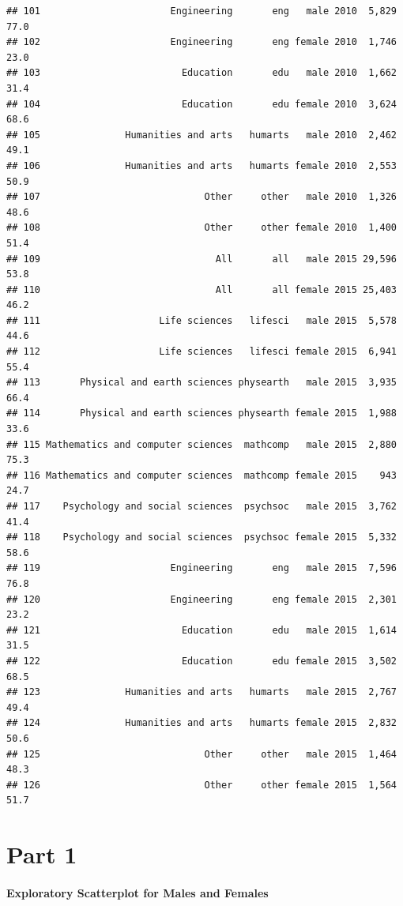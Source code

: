 \documentclass[]{article}
\let\oldparagraph\paragraph
\renewcommand{\paragraph}[1]{\oldparagraph{#1}\mbox{}}
\begin{document}
\begin{verbatim}
## 101                       Engineering       eng   male 2010  5,829    77.0
## 102                       Engineering       eng female 2010  1,746    23.0
## 103                         Education       edu   male 2010  1,662    31.4
## 104                         Education       edu female 2010  3,624    68.6
## 105               Humanities and arts   humarts   male 2010  2,462    49.1
## 106               Humanities and arts   humarts female 2010  2,553    50.9
## 107                             Other     other   male 2010  1,326    48.6
## 108                             Other     other female 2010  1,400    51.4
## 109                               All       all   male 2015 29,596    53.8
## 110                               All       all female 2015 25,403    46.2
## 111                     Life sciences   lifesci   male 2015  5,578    44.6
## 112                     Life sciences   lifesci female 2015  6,941    55.4
## 113       Physical and earth sciences physearth   male 2015  3,935    66.4
## 114       Physical and earth sciences physearth female 2015  1,988    33.6
## 115 Mathematics and computer sciences  mathcomp   male 2015  2,880    75.3
## 116 Mathematics and computer sciences  mathcomp female 2015    943    24.7
## 117    Psychology and social sciences  psychsoc   male 2015  3,762    41.4
## 118    Psychology and social sciences  psychsoc female 2015  5,332    58.6
## 119                       Engineering       eng   male 2015  7,596    76.8
## 120                       Engineering       eng female 2015  2,301    23.2
## 121                         Education       edu   male 2015  1,614    31.5
## 122                         Education       edu female 2015  3,502    68.5
## 123               Humanities and arts   humarts   male 2015  2,767    49.4
## 124               Humanities and arts   humarts female 2015  2,832    50.6
## 125                             Other     other   male 2015  1,464    48.3
## 126                             Other     other female 2015  1,564    51.7
\end{verbatim}

\section{Part 1}\label{part-1}

\paragraph{Exploratory Scatterplot for Males and
Females}\label{exploratory-scatterplot-for-males-and-females}
\end{document}
